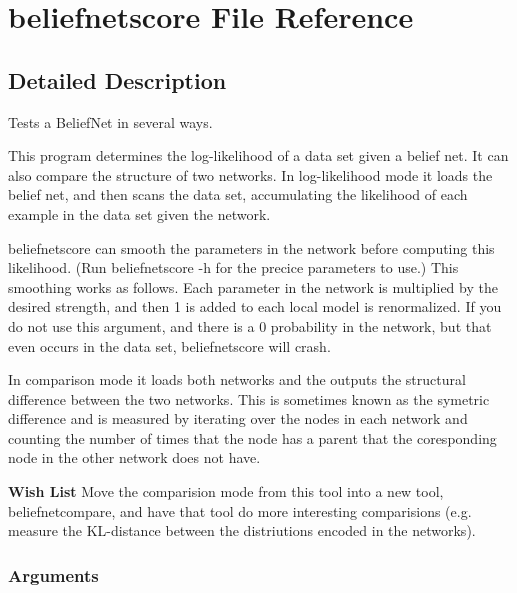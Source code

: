 \section{beliefnetscore File Reference}
\label{beliefnetscore}


\subsection{Detailed Description}
Tests a Belief\-Net in several ways. 

This program determines the log-likelihood of a data set given a belief net. It can also compare the structure of two networks. In log-likelihood mode it loads the belief net, and then scans the data set, accumulating the likelihood of each example in the data set given the network.

beliefnetscore can smooth the parameters in the network before computing this likelihood. (Run beliefnetscore -h for the precice parameters to use.) This smoothing works as follows. Each parameter in the network is multiplied by the desired strength, and then 1 is added to each local model is renormalized. If you do not use this argument, and there is a 0 probability in the network, but that even occurs in the data set, beliefnetscore will crash.

In comparison mode it loads both networks and the outputs the structural difference between the two networks. This is sometimes known as the symetric difference and is measured by iterating over the nodes in each network and counting the number of times that the node has a parent that the coresponding node in the other network does not have.

\begin{Desc}
\item[{\bf Wish List}]Move the comparision mode from this tool into a new tool, beliefnetcompare, and have that tool do more interesting comparisions (e.g. measure the KL-distance between the distriutions encoded in the networks). \end{Desc}
\subsubsection*{Arguments}

